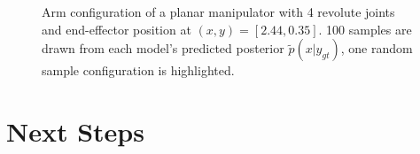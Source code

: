 \documentclass[conference]{IEEEtran}
\begin{document}
\begin{figure}[t]
\centering
    
	\caption{\label{fig:posterior:4dof} Arm configuration of a planar manipulator with 4 revolute joints and end-effector position at $(x, y) = [2.44, 0.35]$. 100 samples are drawn from each model's predicted posterior $\tilde{p}(x | y_{gt})$, one random sample configuration is highlighted.}
\end{figure}


\section*{Next Steps}


\nocite{*}


\end{document}

